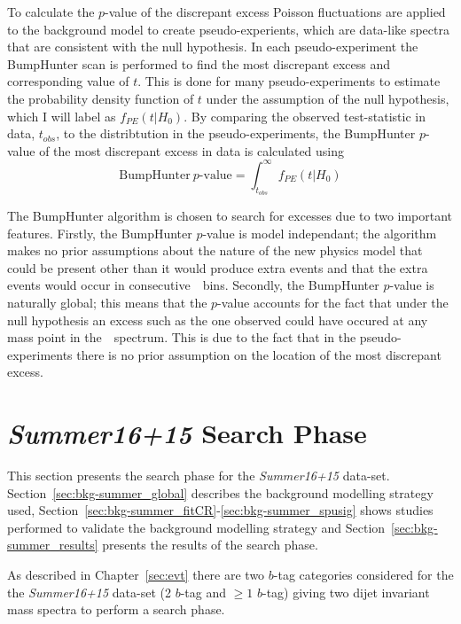 To calculate the $p$-value of the discrepant excess
Poisson fluctuations are applied to the background model to create pseudo-experients,
which are data-like spectra that are consistent with the null hypothesis.
In each pseudo-experiment the BumpHunter scan is performed to find the most discrepant excess and corresponding value of $t$.
This is done for many pseudo-experiments to estimate the probability density function of $t$ under the assumption of the null hypothesis,
which I will label as $f_{PE}(t| H_0)$.
By comparing the observed test-statistic in data, $t_{obs}$,
to the distribtution in the pseudo-experiments,
the BumpHunter $p$-value of the most discrepant excess in data is calculated using
\begin{equation}
  \text{BumpHunter}~p\text{-value} = \int_{t_{obs}}^\infty f_{PE}(t | H_0)
\end{equation}

The BumpHunter algorithm is chosen to search for excesses due to two important features.
Firstly, the BumpHunter $p$-value is model independant;
the algorithm makes no prior assumptions about the nature of the new physics model that could be present
other than it would produce extra events and that the extra events would occur in consecutive~\mjj~bins.
Secondly, the BumpHunter $p$-value is naturally global;
this means that the $p$-value accounts for the fact that under the null hypothesis an excess such as the one observed could have occured at any mass point in the~\mjj~spectrum.
This is due to the fact that in the pseudo-experiments there is no prior assumption on the location of the most discrepant excess.

\section{\textit{Summer16+15} Search Phase}
\label{sec:bkg-summer}

This section presents the search phase for the \textit{Summer16+15} data-set.
Section~\ref{sec:bkg-summer_global} describes the background modelling strategy used,
Section~\ref{sec:bkg-summer_fitCR}-\ref{sec:bkg-summer_spusig}
shows studies performed to validate the background modelling strategy
and Section~\ref{sec:bkg-summer_results} presents the results of the search phase.

As described in Chapter~\ref{sec:evt}
there are two $b$-tag categories considered for the the \textit{Summer16+15} data-set 
(2 $b$-tag and $\geq1$ $b$-tag)
giving two dijet invariant mass spectra to perform a search phase.

